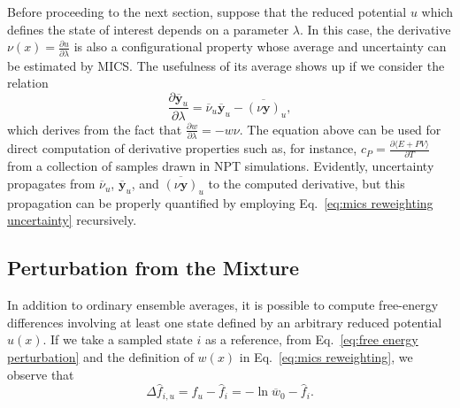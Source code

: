 \documentclass[journal=jctcce,manuscript=article,layout=twocolumn]{achemso}
\newcommand{\vt}[1]{\boldsymbol{\mathbf{#1}}}   %
\newcommand{\diff}[2]{\frac{\partial #1}{\partial #2}} %
\newcommand{\avg}[1]{\overline{#1}}             %
\begin{document}
Before proceeding to the next section, suppose that the reduced potential $u$ which defines the state of interest depends on a parameter $\lambda$. In this case, the derivative $\nu(x) = \frac{\partial u}{\partial \lambda}$ is also a configurational property whose average and uncertainty can be estimated by MICS. The usefulness of its average shows up if we consider the relation
\begin{equation*}
\diff{\avg{\vt y}_u}{\lambda} = \avg{\nu}_u \avg{\vt y}_u - \avg{(\nu \vt y)}_u,
\end{equation*}
which derives from the fact that $\frac{\partial w}{\partial \lambda} = - w \nu$. The equation above can be used for direct computation of derivative properties such as, for instance, $c_P = \frac{\partial \langle E + PV \rangle}{\partial T}$ from a collection of samples drawn in NPT simulations. Evidently, uncertainty propagates from $\avg{\nu}_u$, $\avg{\vt y}_u$, and $\avg{(\nu \vt y)}_u$ to the computed derivative, but this propagation can be properly quantified by employing Eq.~\eqref{eq:mics reweighting uncertainty} recursively.

\subsection{Perturbation from the Mixture}

In addition to ordinary ensemble averages, it is possible to compute free-energy differences involving at least one state defined by an arbitrary reduced potential $u(x)$. If we take a sampled state $i$ as a reference, from Eq.~\eqref{eq:free energy perturbation} and the definition of $w(x)$ in Eq.~\eqref{eq:mics reweighting}, we observe that
\begin{equation}
\label{eq:mics fep}
\Delta {\hat f}_{i,u} = {\hat f}_u - {\hat f}_i = -\ln \avg{w}_0 - {\hat f}_i.
\end{equation}
\end{document}
